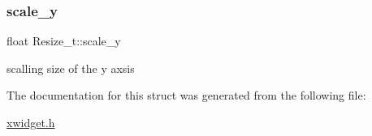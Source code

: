 \subsubsection{\texorpdfstring{scale\+\_\+y}{scale\_y}}
{\footnotesize\ttfamily float Resize\+\_\+t\+::scale\+\_\+y}

scalling size of the y axsis 

The documentation for this struct was generated from the following file\+:\begin{DoxyCompactItemize}
\item 
\hyperlink{xwidget_8h}{xwidget.\+h}\end{DoxyCompactItemize}
